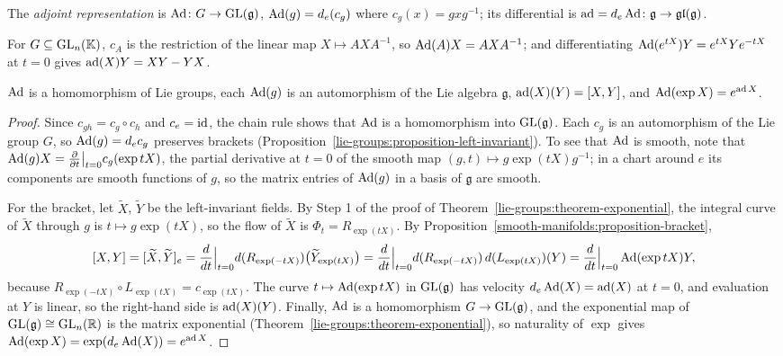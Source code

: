\begin{definition}\label{lie-groups:definition-adjoint}
The \emph{adjoint representation} is $\operatorname{Ad} \colon G \to \mathrm{GL}(\mathfrak{g})$, $\operatorname{Ad}(g) = d_e(c_g)$ where $c_g(x) = gxg^{-1}$; its differential is $\operatorname{ad} = d_e\operatorname{Ad} \colon \mathfrak{g} \to \mathfrak{gl}(\mathfrak{g})$.
\end{definition}

For $G \subseteq \mathrm{GL}_n(\mathbb{K})$, $c_A$ is the restriction of the linear map $X \mapsto AXA^{-1}$, so $\operatorname{Ad}(A)X = AXA^{-1}$; and differentiating
$\operatorname{Ad}(e^{tX})Y = e^{tX}Ye^{-tX}$ at $t = 0$ gives $\operatorname{ad}(X)Y = XY - YX$.

\begin{proposition}\label{lie-groups:proposition-adjoint}
$\operatorname{Ad}$ is a homomorphism of Lie groups, each $\operatorname{Ad}(g)$ is an automorphism of the Lie algebra $\mathfrak{g}$, $\operatorname{ad}(X)(Y) = [X, Y]$, and $\operatorname{Ad}(\exp X) = e^{\operatorname{ad} X}$.
\end{proposition}

\begin{proof}
Since $c_{gh} = c_g \circ c_h$ and $c_e = \mathrm{id}$, the chain rule shows that $\operatorname{Ad}$ is a homomorphism into $\mathrm{GL}(\mathfrak{g})$. Each $c_g$ is an automorphism of
the Lie group $G$, so $\operatorname{Ad}(g) = d_ec_g$ preserves brackets (Proposition~\ref{lie-groups:proposition-left-invariant}). To see that $\operatorname{Ad}$ is smooth, note that
$\operatorname{Ad}(g)X = \frac{\partial}{\partial t}\big|_{t=0}c_g(\exp tX)$, the partial derivative at $t = 0$ of the smooth map $(g, t) \mapsto g\exp(tX)g^{-1}$; in a chart
around $e$ its components are smooth functions of $g$, so the matrix entries of $\operatorname{Ad}(g)$ in a basis of $\mathfrak{g}$ are smooth.

For the bracket, let $\widetilde{X}$, $\widetilde{Y}$ be the left-invariant fields. By Step 1 of the proof of Theorem~\ref{lie-groups:theorem-exponential}, the
integral curve of $\widetilde{X}$ through $g$ is $t \mapsto g\exp(tX)$, so the flow of $\widetilde{X}$ is $\Phi_t = R_{\exp(tX)}$. By
Proposition~\ref{smooth-manifolds:proposition-bracket},
\[
[X, Y] = [\widetilde{X}, \widetilde{Y}]_e = \frac{d}{dt}\Big|_{t=0}d(R_{\exp(-tX)})\bigl(\widetilde{Y}_{\exp(tX)}\bigr)
= \frac{d}{dt}\Big|_{t=0}d(R_{\exp(-tX)})\,d(L_{\exp(tX)})(Y) = \frac{d}{dt}\Big|_{t=0}\operatorname{Ad}(\exp tX)Y,
\]
because $R_{\exp(-tX)} \circ L_{\exp(tX)} = c_{\exp(tX)}$. The curve $t \mapsto \operatorname{Ad}(\exp tX)$ in $\mathrm{GL}(\mathfrak{g})$ has velocity $d_e\operatorname{Ad}(X) = \operatorname{ad}(X)$ at $t = 0$,
and evaluation at $Y$ is linear, so the right-hand side is $\operatorname{ad}(X)(Y)$. Finally, $\operatorname{Ad}$ is a homomorphism $G \to \mathrm{GL}(\mathfrak{g})$, and the exponential map of
$\mathrm{GL}(\mathfrak{g}) \cong \mathrm{GL}_n(\mathbb{R})$ is the matrix exponential (Theorem~\ref{lie-groups:theorem-exponential}), so naturality of $\exp$ gives
$\operatorname{Ad}(\exp X) = \exp(d_e\operatorname{Ad}(X)) = e^{\operatorname{ad} X}$.
\end{proof}

